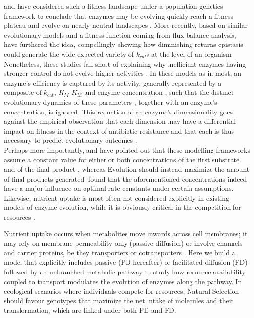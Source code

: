 \documentclass[11pt,onecolumn]{article}
\providecommand{\DIFadd}[1]{{\protect\color{blue} \sf #1}} %
\providecommand{\DIFdel}[1]{{\protect\color{red} \scriptsize #1}} %
\providecommand{\DIFaddbegin}{} %
\providecommand{\DIFaddend}{} %
\providecommand{\DIFdelbegin}{} %
\providecommand{\DIFdelend}{} %
\begin{document}
\citep{Hartl85} \DIFaddbegin \DIFadd{and \citep{Dean86} }\DIFaddend have considered such a fitness landscape under a population genetics framework to conclude that enzymes may \DIFdelbegin \DIFdel{be evolving }\DIFdelend \DIFaddbegin \DIFadd{quickly reach a fitness plateau and evolve }\DIFaddend on nearly neutral landscapes \citep{Ohta92}. \DIFdelbegin \DIFdel{More recently, based on similar evolutionary models and a fitness function coming from flux balance analysis, \citet{Heckmann18} have furthered the idea, compellingly showing how diminishing returns epistasis could generate the wide expected variety of $k_{cat}$s at the level of an organism}\DIFdelend \DIFaddbegin \DIFadd{Nonetheless, these studies fall short of explaining why inefficient enzymes having stronger control do not evolve higher activities \citep{Yi19}}\DIFaddend . In these models as in most, an enzyme's efficiency is captured by its activity, generally represented by a composite of $k_\text{cat}$, \DIFdelbegin \DIFdel{$K_M$ }\DIFdelend \DIFaddbegin \DIFadd{$K_\text{M}$ }\DIFaddend and enzyme concentration \DIFdelbegin \DIFdel{\citep{Hartl85,Kaltenbach14}}\DIFdelend \DIFaddbegin \DIFadd{\citep{Hartl85,Clark91,Chou14,Kaltenbach14}}\DIFaddend , such that the distinct evolutionary dynamics of these parameters\DIFaddbegin \DIFadd{, together with an enzyme's concentration, }\DIFaddend is ignored. \DIFaddbegin \DIFadd{This reduction of an enzyme's dimensionality goes against the empirical observation that each dimension may have a differential impact on fitness in the context of antibiotic resistance \citep{Walkiewicz12,Stiffler15,Rodrigues16} and that each is thus necessary to predict evolutionary outcomes \citep{Walkiewicz12}.}\\
\DIFaddend 

Perhaps more importantly, \citep{Heinrich91} and \citep{Schuster08} have pointed out that these \DIFaddbegin \DIFadd{modelling }\DIFaddend frameworks assume a constant value for either or both concentrations of the first substrate and of the final product \citep{Orth10}, whereas Evolution should instead maximize the amount of final products generated. \citep{Klipp94} found that the aforementioned concentrations indeed have a major influence on optimal rate constants under certain assumptions. 
Likewise, nutrient uptake is most often not considered explicitly in existing models of enzyme evolution, while it is obviously critical in the competition for resources \DIFaddbegin \DIFadd{\citep{Dykhuizen94}}\DIFaddend . 

Nutrient uptake occurs when metabolites move inwards across cell membranes; it may rely on membrane permeability only (passive diffusion) or involve channels and carrier proteins, be they transporters or cotransporters \citep{Stein86a}.
Here we build a model that explicitly includes passive (PD hereafter) or facilitated diffusion (FD) followed by an unbranched metabolic pathway to study how resource availability coupled to transport modulates the evolution of enzymes along the pathway.
In ecological scenarios where individuals compete for resources, Natural Selection should favour genotypes that maximize the net intake of molecules and their transformation, which are linked under both PD and FD.
\DIFaddbegin 
\end{document}
